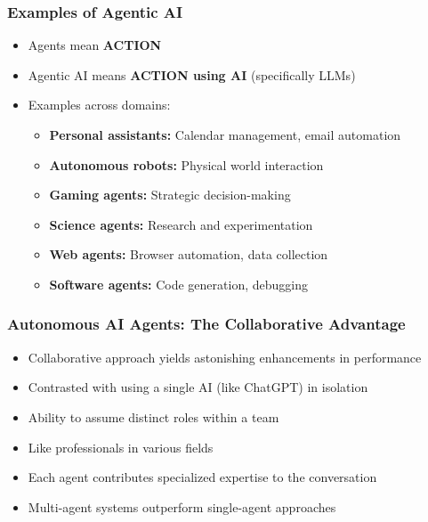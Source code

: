 \begin{frame}[fragile]\frametitle{Examples of Agentic AI}
\begin{itemize}
    \item Agents mean \textbf{ACTION}
    \item Agentic AI means \textbf{ACTION using AI} (specifically LLMs)
    \item Examples across domains:
    \begin{itemize}
        \item \textbf{Personal assistants:} Calendar management, email automation
        \item \textbf{Autonomous robots:} Physical world interaction
        \item \textbf{Gaming agents:} Strategic decision-making
        \item \textbf{Science agents:} Research and experimentation
        \item \textbf{Web agents:} Browser automation, data collection
        \item \textbf{Software agents:} Code generation, debugging
    \end{itemize}
\end{itemize}
\end{frame}

\begin{frame}[fragile]\frametitle{Autonomous AI Agents: The Collaborative Advantage}
\begin{itemize}
    \item Collaborative approach yields astonishing enhancements in performance
    \item Contrasted with using a single AI (like ChatGPT) in isolation
    \item Ability to assume distinct roles within a team
    \item Like professionals in various fields
    \item Each agent contributes specialized expertise to the conversation
    \item Multi-agent systems outperform single-agent approaches
\end{itemize}
\end{frame}

